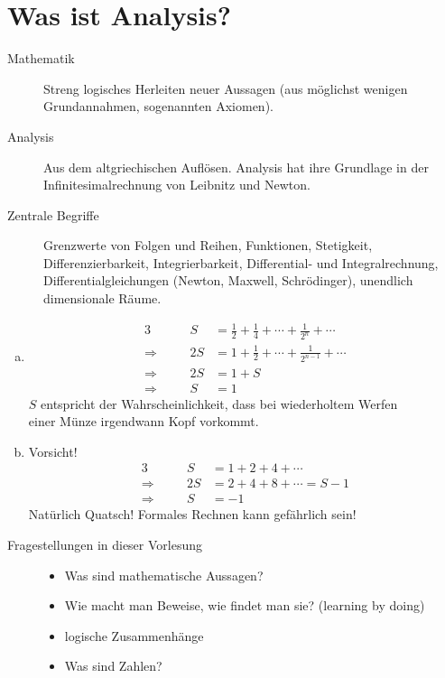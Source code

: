 \documentclass[../ana1.tex]{subfiles}
\begin{document}
\section{Was ist Analysis?}
\begin{description}
	\item[Mathematik]
		Streng logisches Herleiten neuer Aussagen (aus möglichst wenigen Grundannahmen, sogenannten Axiomen).
	\item[Analysis]
		Aus dem altgriechischen \glqq Auflösen\grqq. Analysis hat ihre Grundlage in der \glqq Infinitesimalrechnung\grqq\: von Leibnitz und Newton.
	\item[Zentrale Begriffe]
		Grenzwerte von Folgen und Reihen, Funktionen, Stetigkeit, Differenzierbarkeit, Integrierbarkeit, Differential- und Integralrechnung, Differentialgleichungen (Newton, Maxwell, Schrödinger), unendlich dimensionale Räume.
\end{description}
\begin{bspe}\leavevmode
	\begin{enumerate}[(a)]
		\item
			\begin{alignat*}{3}
							   &&             S &= \frac{1}{2} + \frac{1}{4} + \cdots + \frac{1}{2^{n}} + \cdots \\
				\Longrightarrow&\quad& 		 2S &= 1 + \frac{1}{2} + \cdots + \frac{1}{2^{n-1}} + \cdots \\
				\Longrightarrow&\quad& 	     2S &= 1 + S \\
				\Longrightarrow&&             S &= 1
			\end{alignat*}
			\(S\) entspricht der Wahrscheinlichkeit, dass bei wiederholtem Werfen \\
			einer Münze irgendwann Kopf vorkommt.\\
		\item Vorsicht!
			\begin{alignat*}{3}
							   &&       S &= 1 + 2 + 4 + \cdots\\
				\Longrightarrow&\quad& 2S &= 2 + 4 + 8 + \cdots = S - 1\\
				\Longrightarrow&\quad&  S &= -1
			\end{alignat*}
			Natürlich Quatsch! Formales Rechnen kann gefährlich sein!
	\end{enumerate}
\end{bspe}
\begin{description}
	\item[Fragestellungen in dieser Vorlesung]\leavevmode
		\begin{itemize}
			\item Was sind mathematische Aussagen?
			\item Wie macht man Beweise, wie findet man sie? (learning by doing)
			\item logische Zusammenhänge
			\item Was sind Zahlen?
		\end{itemize} 
\end{description}
\end{document}
